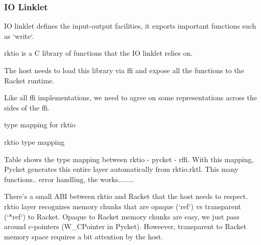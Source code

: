 			\subsubsection{IO Linklet}

				\begin{paragraph-here}%
					IO linklet defines the input-output facilities, it exports important functions such as `write`.
				\end{paragraph-here}

				\begin{paragraph-here}%
					rktio is a C library of functions that the IO linklet relies on.
				\end{paragraph-here}

				\begin{paragraph-here}%
					The host needs to load this library via ffi and expose all the functions to the Racket runtime.
				\end{paragraph-here}

				\begin{paragraph-here}%
					Like all ffi implementations, we need to agree on some representations across the sides of the ffi.
				\end{paragraph-here}

				\begin{table-here}
					type mapping for rktio

					\begin{todo}
						rktio type mapping
					\end{todo}
				\end{table-here}

				\begin{paragraph-here}%
					Table shows the type mapping between rktio - pycket - rffi. With this mapping, Pycket generates this entire layer automatically from rktio.rktl. This many functions.. error handling, the works........
				\end{paragraph-here}

				\begin{paragraph-here}%
					There's a small ABI between rktio and Racket that the host needs to respect. rktio layer recognizes memory chunks that are opaque (`ref`) vs transparent (`*ref`) to Racket. Opaque to Racket memory chunks are easy, we just pass around c-pointers (W\_CPointer in Pycket). Howeever, transparent to Racket memory space requires a bit attention by the host.
				\end{paragraph-here}

